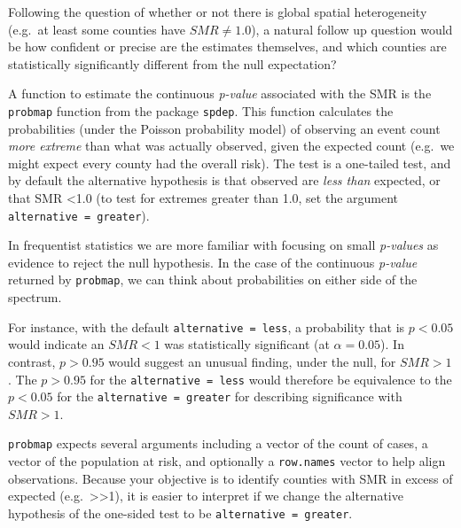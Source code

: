 \documentclass[
]{book}
\newenvironment{rmdnote}[1]
  {
  \begin{itemize}
  \renewcommand{\labelitemi}{
    \raisebox{-.7\height}[0pt][0pt]{
      {\setkeys{Gin}{width=3em,keepaspectratio}\texttt{[image: images/\#1]}}
    }
  }
  \setlength{\fboxsep}{1em}
  \begin{note}
  \item
  }
  {
  \end{note}
  \end{itemize}
  }
\begin{document}
Following the question of whether or not there is global spatial heterogeneity (e.g.~at least some counties have \(SMR\neq 1.0\)), a natural follow up question would be how confident or precise are the estimates themselves, and which counties are statistically significantly different from the null expectation?

A function to estimate the continuous \emph{p-value} associated with the SMR is the \texttt{probmap} function from the package \texttt{spdep}. This function calculates the probabilities (under the Poisson probability model) of observing an event count \emph{more extreme} than what was actually observed, given the expected count (e.g.~we might expect every county had the overall risk). The test is a one-tailed test, and by default the alternative hypothesis is that observed are \emph{less than} expected, or that SMR \textless1.0 (to test for extremes greater than 1.0, set the argument \texttt{alternative\ =\ \textquotesingle{}greater\textquotesingle{}}).

\begin{rmdnote}{note}
In frequentist statistics we are more familiar with focusing on small \emph{p-values} as evidence to reject the null hypothesis. In the case of the continuous \emph{p-value} returned by \texttt{probmap}, we can think about probabilities on either side of the spectrum.

For instance, with the default \texttt{alternative\ =\ \textquotesingle{}less\textquotesingle{}}, a probability that is \(p<0.05\) would indicate an \(SMR<1\) was statistically significant (at \(\alpha=0.05\)). In contrast, \(p>0.95\) would suggest an unusual finding, under the null, for \(SMR>1\). The \(p>0.95\) for the \texttt{alternative\ =\ \textquotesingle{}less\textquotesingle{}} would therefore be equivalence to the \(p<0.05\) for the \texttt{alternative\ =\ \textquotesingle{}greater\textquotesingle{}} for describing significance with \(SMR>1\).

\end{rmdnote}

\texttt{probmap} expects several arguments including a vector of the count of cases, a vector of the population at risk, and optionally a \texttt{row.names} vector to help align observations. Because your objective is to identify counties with SMR in excess of expected (e.g.~\textgreater\textgreater1), it is easier to interpret if we change the alternative hypothesis of the one-sided test to be \texttt{alternative\ =\ \textquotesingle{}greater\textquotesingle{}}.
\end{document}
